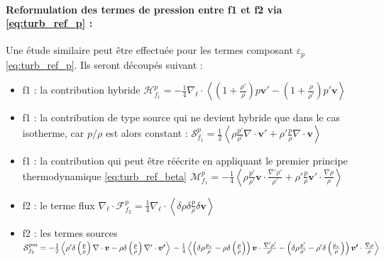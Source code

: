  \paragraph{Reformulation des termes de pression entre f1 et f2 via \eqref{eq:turb_ref_p} :}
Une étude similaire peut être effectuée pour les termes composant $\varepsilon_{p}$ \eqref{eq:turb_ref_p}. 
 Ils seront découpés suivant : 
 \begin{itemize}
     \item f1 : la contribution hybride $\mathcal{H}^{p}_{f_1} = - \frac{1}{4} \nabla_{\boldsymbol{\ell}} \cdot \left<\left(1+\frac{\rho'}{\rho}\right) p \boldsymbol{v'} - \left(1+\frac{\rho}{\rho'}\right)p'\boldsymbol{v} \right>$
     \item f1 : la contribution de type source qui ne devient hybride que dans le cas isotherme, car $p/\rho$ est alors constant : 
         $\mathcal{S}^{p}_{f_1} =  \frac{1}{2} \left<\rho  \frac{p'}{\rho'} \nabla \cdot \boldsymbol{v'} + \rho' \frac{p}{\rho} \nabla \cdot \boldsymbol{v}\right>$
     \item f1 : la contribution qui peut être réécrite en appliquant le premier principe thermodynamique \eqref{eq:turb_ref_beta} $\mathcal{M}^{p}_{f_1} =  -\frac{1}{4} \left<\rho \frac{p'}{\rho'} \boldsymbol{v} \cdot \frac{\nabla'\rho'}{\rho'} + \rho' \frac{p}{\rho} \boldsymbol{v'} \cdot \frac{\nabla\rho}{\rho}  \right> $
     \item f2 : le terme flux $\nabla_{\boldsymbol{\ell}} \cdot \mathcal{F}^{p}_{f_2} = \frac{1}{4} \nabla_{\boldsymbol{\ell}} \cdot\left<\delta \rho  \delta \frac{p}{\rho} \delta \boldsymbol{v}\right> $ 
     \item f2 : les termes sources $\mathcal{S}^{pm}_{f_2} =  - \frac{1}{2}  \left<  \rho' \delta \left(\frac{p}{\rho}\right) \nabla \cdot \boldsymbol{v} -   \rho \delta \left(\frac{p}{\rho}\right) \nabla' \cdot \boldsymbol{v'} \right>\\-\frac{1}{4} \left<\left(\delta \rho \frac{p_*}{\rho} - \rho \delta \left(\frac{p}{\rho}\right)\right)\boldsymbol{v} \cdot \frac{\nabla' \rho'}{\rho'} - \left(\delta \rho \frac{p'}{\rho'} - \rho' \delta \left(\frac{p_*}{\rho}\right)\right)\boldsymbol{v'} \cdot \frac{\nabla \rho}{\rho}\right>$
 \end{itemize}
